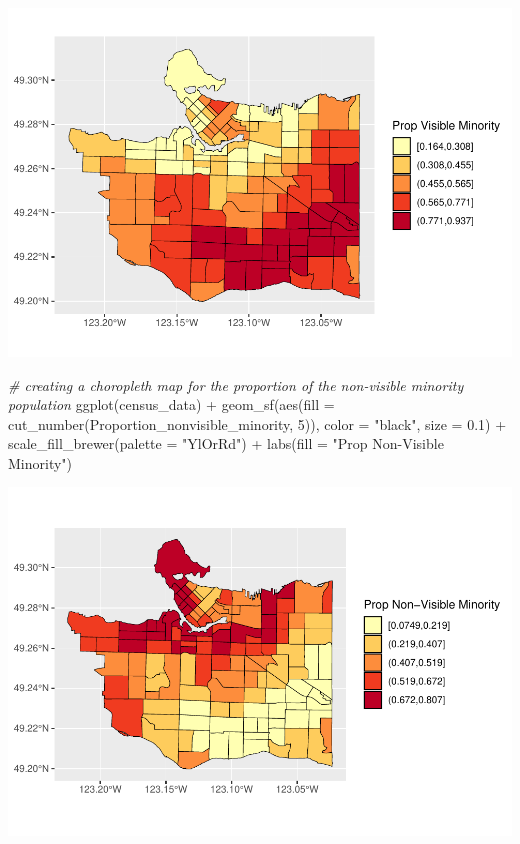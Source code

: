 \documentclass[
]{article}
\newenvironment{Shaded}{\begin{snugshade}}{\end{snugshade}}
\newcommand{\AttributeTok}[1]{\textcolor[rgb]{0.77,0.63,0.00}{#1}}
\newcommand{\CommentTok}[1]{\textcolor[rgb]{0.56,0.35,0.01}{\textit{#1}}}
\newcommand{\DecValTok}[1]{\textcolor[rgb]{0.00,0.00,0.81}{#1}}
\newcommand{\FloatTok}[1]{\textcolor[rgb]{0.00,0.00,0.81}{#1}}
\newcommand{\FunctionTok}[1]{\textcolor[rgb]{0.00,0.00,0.00}{#1}}
\newcommand{\NormalTok}[1]{#1}
\newcommand{\SpecialCharTok}[1]{\textcolor[rgb]{0.00,0.00,0.00}{#1}}
\newcommand{\StringTok}[1]{\textcolor[rgb]{0.31,0.60,0.02}{#1}}
\begin{document}
\includegraphics{4GA3Markdown_files/figure-latex/unnamed-chunk-24-1.pdf}

\begin{Shaded}
\begin{Highlighting}[]
\CommentTok{\# creating a choropleth map for the proportion of the non{-}visible minority population}
\FunctionTok{ggplot}\NormalTok{(census\_data) }\SpecialCharTok{+}
\FunctionTok{geom\_sf}\NormalTok{(}\FunctionTok{aes}\NormalTok{(}\AttributeTok{fill =} \FunctionTok{cut\_number}\NormalTok{(Proportion\_nonvisible\_minority, }\DecValTok{5}\NormalTok{)),}
        \AttributeTok{color =} \StringTok{"black"}\NormalTok{,}
        \AttributeTok{size =} \FloatTok{0.1}\NormalTok{) }\SpecialCharTok{+}
\FunctionTok{scale\_fill\_brewer}\NormalTok{(}\AttributeTok{palette =} \StringTok{"YlOrRd"}\NormalTok{) }\SpecialCharTok{+}
\FunctionTok{labs}\NormalTok{(}\AttributeTok{fill =} \StringTok{"Prop Non{-}Visible Minority"}\NormalTok{)}
\end{Highlighting}
\end{Shaded}

\includegraphics{4GA3Markdown_files/figure-latex/unnamed-chunk-25-1.pdf}
\end{document}
